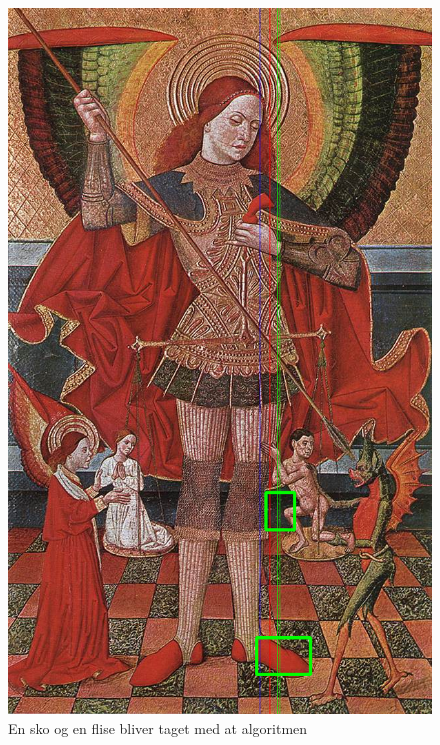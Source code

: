 \begin{figure}[h!!]
	\begin{center}
		\includegraphics[scale=0.3,angle=0]{afsnit/afprovning/billeder/udvidet_losning/udvidet_kfarver_kdetaljer.png}
	\end{center}
	\caption[]{En sko og en flise bliver taget med at algoritmen}
	\label{udvidet_virker_ikke1}
\end{figure}


